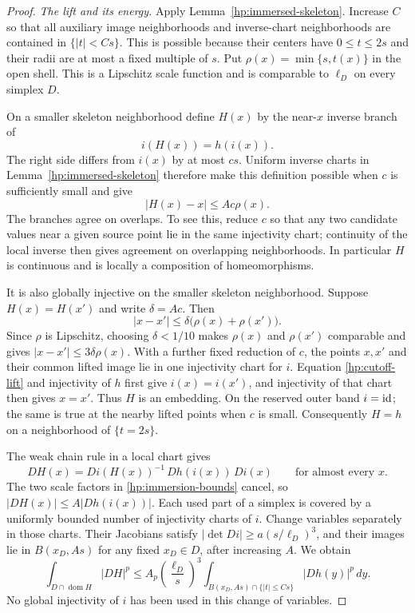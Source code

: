 \begin{proof}
\emph{The lift and its energy.}
Apply Lemma~\ref{hp:immersed-skeleton}.  Increase $C$ so that all
auxiliary image neighborhoods and inverse-chart neighborhoods are
contained in $\{|t|<Cs\}$.  This is possible because their centers have
$0\leq t\leq2s$ and their radii are at most a fixed multiple of $s$.
Put $\rho(x)=\min\{s,t(x)\}$ in the open shell.  This is a Lipschitz
scale function and is comparable to $\ell_D$ on every simplex $D$.

On a smaller skeleton neighborhood define $H(x)$ by the near-$x$
inverse branch of
\begin{equation}\label{hp:cutoff-lift}
 i(H(x))=h(i(x)).
\end{equation}
The right side differs from $i(x)$ by at most $cs$.  Uniform inverse
charts in Lemma~\ref{hp:immersed-skeleton} therefore make this
definition possible when $c$ is sufficiently small and give
\begin{equation}\label{hp:lift-displacement}
 |H(x)-x|\leq A c\rho(x).
\end{equation}
The branches agree on overlaps.  To see this, reduce $c$ so that any
two candidate values near a given source point lie in the same
injectivity chart; continuity of the local inverse then gives agreement
on overlapping neighborhoods.  In particular $H$ is continuous and
is locally a composition of homeomorphisms.

It is also globally injective on the smaller skeleton neighborhood.
Suppose $H(x)=H(x')$ and write $\delta=Ac$.  Then
\[
 |x-x'|\leq\delta\bigl(\rho(x)+\rho(x')\bigr).
\]
Since $\rho$ is Lipschitz, choosing $\delta<1/10$ makes $\rho(x)$ and
$\rho(x')$ comparable and gives $|x-x'|\leq3\delta\rho(x)$.
With a further fixed reduction of $c$, the points $x,x'$ and their
common lifted image lie in one injectivity chart for $i$.  Equation
\eqref{hp:cutoff-lift} and injectivity of $h$ first give
$i(x)=i(x')$, and injectivity of that chart then gives $x=x'$.
Thus $H$ is an embedding.  On the reserved outer band $i=\operatorname{id}$; the
same is true at the nearby lifted points when $c$ is small.  Consequently
$H=h$ on a neighborhood of $\{t=2s\}$.

The weak chain rule in a local chart gives
\[
 DH(x)=Di(H(x))^{-1}\,Dh(i(x))\,Di(x)
 \qquad\text{for almost every }x.
\]
The two scale factors in \eqref{hp:immersion-bounds} cancel, so
$|DH(x)|\leq A|Dh(i(x))|$.  Each used part of a simplex is covered by
a uniformly bounded number of injectivity charts of $i$.  Change
variables separately in those charts.  Their Jacobians satisfy
$|\det Di|\geq a(s/\ell_D)^3$, and their images lie in
$B(x_D,As)$ for any fixed $x_D\in D$, after increasing $A$.  We obtain
\begin{equation}\label{hp:lift-cell-energy}
 \int_{D\cap\operatorname{dom}H}|DH|^p
 \leq A_p\left(\frac{\ell_D}{s}\right)^3
       \int_{B(x_D,As)\cap\{|t|\leq Cs\}}|Dh(y)|^p\,dy.
\end{equation}
No global injectivity of $i$ has been used in this change of variables.


\end{proof}

